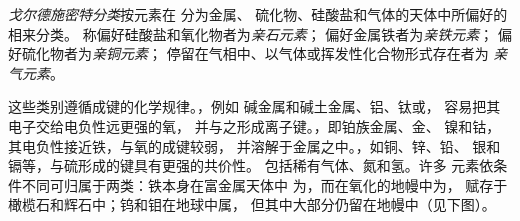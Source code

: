 \begin{definition}[戈尔德施密特分类]
\label{def:b2:elements-in-the-earth:goldschmidt}
\emph{戈尔德施密特分类}按元素在
分为金属、
硫化物、硅酸盐和气体的天体中所偏好的相来分类。
称偏好硅酸盐和氧化物者为\emph{亲石元素}；
偏好金属铁者为\emph{亲铁元素}；
偏好硫化物者为\emph{亲铜元素}；
停留在气相中、以气体或挥发性化合物形式存在者为
\emph{亲气元素}。
\end{definition}

这些类别遵循成键的化学规律。，例如
碱金属和碱土金属、铝、钛或，
容易把其电子交给电负性远更强的氧，
并与之形成离子键。，即铂族金属、金、
镍和钴，其电负性接近铁，与氧的成键较弱，
并溶解于金属之中。，如铜、锌、铅、
银和镉等，与硫形成的键具有更强的共价性。
包括稀有气体、氮和氢。许多
元素依条件不同可归属于两类：铁本身在富金属天体中
为，而在氧化的地幔中为，
赋存于橄榄石和辉石中；钨和钼在地球中属，
但其中大部分仍留在地幔中（见下图）。

